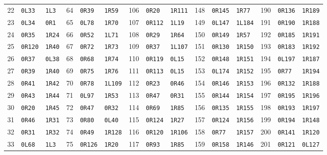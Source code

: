 \begin{center}
\begin{tabular}{rll@{\qquad}rll@{\qquad}rll@{\qquad}rll@{\qquad}rll}
22 & \texttt{0L33} & \texttt{1L3} & 64 & \texttt{0R39} & \texttt{1R59} & 106 & \texttt{0R20} & \texttt{1R111} & 148 & \texttt{0R145} & \texttt{1R77} & 190 & \texttt{0R136} & \texttt{1R189} \\
23 & \texttt{0L34} & \texttt{0R1} & 65 & \texttt{0L78} & \texttt{1R70} & 107 & \texttt{0R112} & \texttt{1L19} & 149 & \texttt{0L147} & \texttt{1L184} & 191 & \texttt{0R190} & \texttt{1R188} \\
24 & \texttt{0R35} & \texttt{1R24} & 66 & \texttt{0R52} & \texttt{1L71} & 108 & \texttt{0R29} & \texttt{1R64} & 150 & \texttt{0R149} & \texttt{1R57} & 192 & \texttt{0R185} & \texttt{1R191} \\
25 & \texttt{0R120} & \texttt{1R40} & 67 & \texttt{0R72} & \texttt{1R73} & 109 & \texttt{0R37} & \texttt{1L107} & 151 & \texttt{0R130} & \texttt{1R150} & 193 & \texttt{0R183} & \texttt{1R192} \\
26 & \texttt{0R37} & \texttt{0L38} & 68 & \texttt{0R68} & \texttt{1R74} & 110 & \texttt{0R119} & \texttt{0L15} & 152 & \texttt{0R148} & \texttt{1R151} & 194 & \texttt{0L197} & \texttt{1R187} \\
27 & \texttt{0R39} & \texttt{1R40} & 69 & \texttt{0R75} & \texttt{1R76} & 111 & \texttt{0R113} & \texttt{0L15} & 153 & \texttt{0L174} & \texttt{1R152} & 195 & \texttt{0R77} & \texttt{1R194} \\
28 & \texttt{0R41} & \texttt{1R42} & 70 & \texttt{0R78} & \texttt{1L109} & 112 & \texttt{0R23} & \texttt{0R46} & 154 & \texttt{0R146} & \texttt{1R153} & 196 & \texttt{0R132} & \texttt{1R188} \\
29 & \texttt{0R43} & \texttt{1R44} & 71 & \texttt{0L97} & \texttt{1R53} & 113 & \texttt{0R47} & \texttt{0R31} & 155 & \texttt{0R144} & \texttt{1R154} & 197 & \texttt{0R195} & \texttt{1R196} \\
30 & \texttt{0R20} & \texttt{1R45} & 72 & \texttt{0R47} & \texttt{0R32} & 114 & \texttt{0R69} & \texttt{1R85} & 156 & \texttt{0R135} & \texttt{1R155} & 198 & \texttt{0R193} & \texttt{1R197} \\
31 & \texttt{0R46} & \texttt{1R31} & 73 & \texttt{0R80} & \texttt{0L40} & 115 & \texttt{0R124} & \texttt{1R27} & 157 & \texttt{0R124} & \texttt{1R156} & 199 & \texttt{0R194} & \texttt{1R148} \\
32 & \texttt{0R31} & \texttt{1R32} & 74 & \texttt{0R49} & \texttt{1R128} & 116 & \texttt{0R120} & \texttt{1R106} & 158 & \texttt{0R77} & \texttt{1R157} & 200 & \texttt{0R141} & \texttt{1R120} \\
33 & \texttt{0L68} & \texttt{1L3} & 75 & \texttt{0R126} & \texttt{1R20} & 117 & \texttt{0R93} & \texttt{1R85} & 159 & \texttt{0R158} & \texttt{1R146} & 201 & \texttt{0R121} & \texttt{0L127} \\

\end{tabular}
\end{center}
